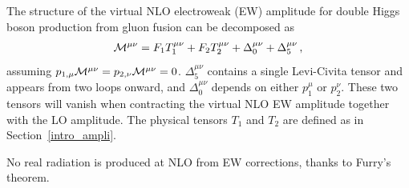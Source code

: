 


The structure of the virtual NLO electroweak (EW) amplitude for double Higgs boson production from gluon fusion can be decomposed as~\cite{Bi:2023bnq}
\begin{align}
{\cal M}^{\mu\nu}=F_1T_1 ^{\mu\nu}+F_2T_2 ^{\mu\nu}+\Delta_0^{\mu\nu}+\Delta_5^{\mu\nu}
\,,
\label{eqref:decamplitudeEW}
\end{align}
assuming $p_{1,\mu}{\cal M}^{\mu\nu}=p_{2,\nu}{\cal M}^{\mu\nu}=0$. $\Delta_5^{\mu\nu}$ contains a single Levi-Civita tensor and appears from two loops onward, and $\Delta_0^{\mu\nu}$ depends on either $p_1^{\mu}$ or $p_2^{\nu}$. These two tensors will vanish when contracting the virtual NLO EW amplitude together with the LO amplitude. The physical tensors $T_1$ and $T_2$ are defined as in Section~\ref{intro_ampli}.

No real radiation is produced at NLO from EW corrections, thanks to Furry's theorem.
